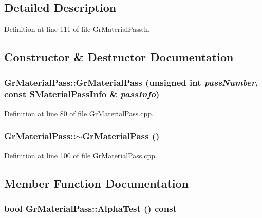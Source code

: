 \subsection{Detailed Description}


Definition at line 111 of file GrMaterialPass.h.

\subsection{Constructor \& Destructor Documentation}
\hypertarget{class_gr_material_pass_d51b379c745b2f20189f9d2f141ccc2b}{
\subsubsection[{GrMaterialPass}]{\setlength{\rightskip}{0pt plus 5cm}GrMaterialPass::GrMaterialPass (unsigned int {\em passNumber}, \/  const {\bf SMaterialPassInfo} \& {\em passInfo})}}
\label{class_gr_material_pass_d51b379c745b2f20189f9d2f141ccc2b}




Definition at line 80 of file GrMaterialPass.cpp.\hypertarget{class_gr_material_pass_892c0b01e532282399b758197ae866f7}{
\subsubsection[{$\sim$GrMaterialPass}]{\setlength{\rightskip}{0pt plus 5cm}GrMaterialPass::$\sim$GrMaterialPass ()}}
\label{class_gr_material_pass_892c0b01e532282399b758197ae866f7}




Definition at line 100 of file GrMaterialPass.cpp.

\subsection{Member Function Documentation}
\hypertarget{class_gr_material_pass_854289ca69d0efcfe29047c80c25fd3d}{
\subsubsection[{AlphaTest}]{\setlength{\rightskip}{0pt plus 5cm}bool GrMaterialPass::AlphaTest () const}}
\label{class_gr_material_pass_854289ca69d0efcfe29047c80c25fd3d}




